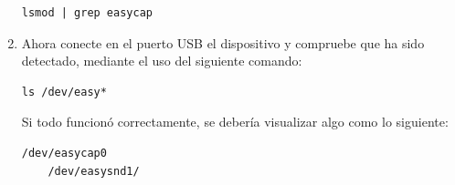 \begin{enumerate}
  \begin{lstlisting}[style=consola]
    lsmod | grep easycap
  \end{lstlisting} 
  
\item Ahora conecte en el puerto USB el dispositivo y compruebe que ha sido detectado, mediante el uso del siguiente comando:
  \begin{lstlisting}[style=consola]
ls /dev/easy*
  \end{lstlisting}
  
  Si todo funcionó correctamente, se debería visualizar algo como lo siguiente:
  \begin{lstlisting}[style=consola]
    /dev/easycap0
    /dev/easysnd1/
  \end{lstlisting}
  
\end{enumerate}
